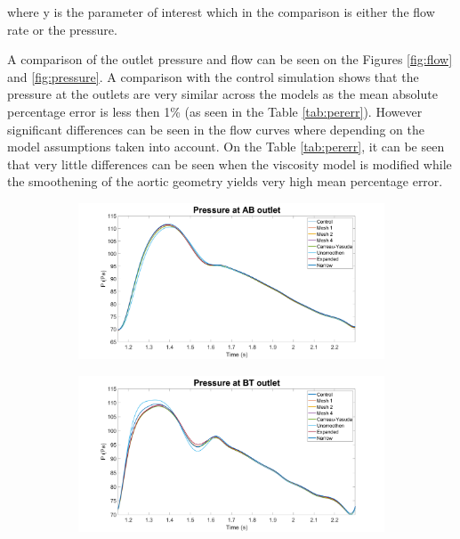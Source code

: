 where y is the parameter of interest which in the comparison is either the flow rate or the pressure. \par
A comparison of the outlet pressure and flow can be seen on the Figures \ref{fig:flow} and \ref{fig:pressure}. A comparison with the control simulation shows that the pressure at the outlets are very similar across the models as the mean absolute percentage error is less then 1\% (as seen in the Table \ref{tab:pererr}). However significant differences can be seen in the flow curves where depending on the model assumptions taken into account. On the Table \ref{tab:pererr}, it can be seen that very little differences can be seen when the viscosity model is modified while the smoothening of the aortic geometry yields very high mean percentage error. \par
\begin{figure}
     \centering
     \begin{subfigure}[b]{0.49\textwidth}
         \centering
         \includegraphics[width=\textwidth]{Figures/PAB.png}
     \end{subfigure}
     \hfill
     \begin{subfigure}[b]{0.49\textwidth}
         \centering
         \includegraphics[width=\textwidth]{Figures/PBT.png}

\end{subfigure}
\end{figure}
